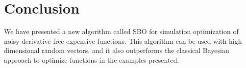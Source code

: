 \documentclass{article} %
\begin{document}
\section{Conclusion}
\label{conclusion}
We have presented a new algorithm called SBO for simulation optimization of noisy derivative-free expensive functions. This algorithm can be used with high dimensional random vectors, and it also outperforms the classical Bayesian approach to optimize functions in the examples presented. 







\clearpage


\end{document}
